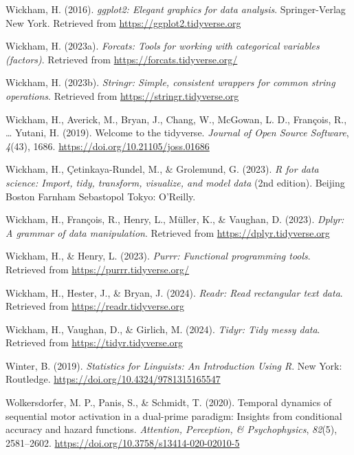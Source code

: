 \documentclass[
  man, donotrepeattitle,floatsintext]{apa6}
\newlength{\cslhangindent}
\newenvironment{CSLReferences}[2] %
 {\begin{list}{}{%
  \setlength{\itemindent}{0pt}
  \setlength{\leftmargin}{0pt}
  \setlength{\parsep}{0pt}
  \ifodd #1
   \setlength{\leftmargin}{\cslhangindent}
   \setlength{\itemindent}{-1\cslhangindent}
  \fi
  \setlength{\itemsep}{#2\baselineskip}}}
 {\end{list}}
\begin{document}
\begin{CSLReferences}{1}{0}
Wickham, H. (2016). \emph{ggplot2: Elegant graphics for data analysis}. Springer-Verlag New York. Retrieved from \url{https://ggplot2.tidyverse.org}

Wickham, H. (2023a). \emph{Forcats: Tools for working with categorical variables (factors)}. Retrieved from \url{https://forcats.tidyverse.org/}

Wickham, H. (2023b). \emph{Stringr: Simple, consistent wrappers for common string operations}. Retrieved from \url{https://stringr.tidyverse.org}

Wickham, H., Averick, M., Bryan, J., Chang, W., McGowan, L. D., François, R., \ldots{} Yutani, H. (2019). Welcome to the {tidyverse}. \emph{Journal of Open Source Software}, \emph{4}(43), 1686. \url{https://doi.org/10.21105/joss.01686}

Wickham, H., Çetinkaya-Rundel, M., \& Grolemund, G. (2023). \emph{R for data science: Import, tidy, transform, visualize, and model data} (2nd edition). Beijing Boston Farnham Sebastopol Tokyo: O'Reilly.

Wickham, H., François, R., Henry, L., Müller, K., \& Vaughan, D. (2023). \emph{Dplyr: A grammar of data manipulation}. Retrieved from \url{https://dplyr.tidyverse.org}

Wickham, H., \& Henry, L. (2023). \emph{Purrr: Functional programming tools}. Retrieved from \url{https://purrr.tidyverse.org/}

Wickham, H., Hester, J., \& Bryan, J. (2024). \emph{Readr: Read rectangular text data}. Retrieved from \url{https://readr.tidyverse.org}

Wickham, H., Vaughan, D., \& Girlich, M. (2024). \emph{Tidyr: Tidy messy data}. Retrieved from \url{https://tidyr.tidyverse.org}

Winter, B. (2019). \emph{Statistics for {Linguists}: {An Introduction Using R}}. New York: Routledge. \url{https://doi.org/10.4324/9781315165547}

Wolkersdorfer, M. P., Panis, S., \& Schmidt, T. (2020). Temporal dynamics of sequential motor activation in a dual-prime paradigm: {Insights} from conditional accuracy and hazard functions. \emph{Attention, Perception, \& Psychophysics}, \emph{82}(5), 2581--2602. \url{https://doi.org/10.3758/s13414-020-02010-5}

\end{CSLReferences}
\end{document}
